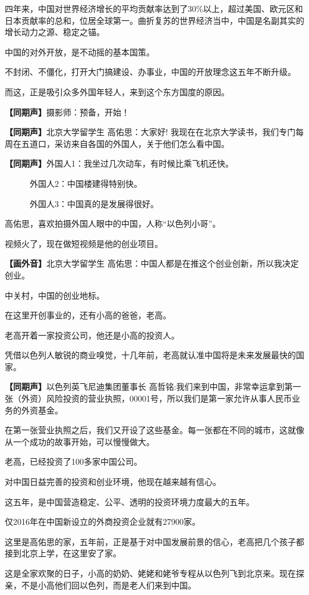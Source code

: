 \documentclass{ctexart}
\newcommand{\zkh}[1]{\textbf{\hspace{-2.7em} 【#1】}}
\begin{document}
四年来，中国对世界经济增长的平均贡献率达到了30{\%}以上，超过美国、欧元区和日本贡献率的总和，位居全球第一。曲折复苏的世界经济当中，中国是名副其实的增长动力之源、稳定之锚。

中国的对外开放，是不动摇的基本国策。

不封闭、不僵化，打开大门搞建设、办事业，中国的开放理念这五年不断升级。

而这，正是吸引众多外国年轻人，来到这个东方国度的原因。

\zkh{同期声}摄影师：预备，开始！

\zkh{同期声}北京大学留学生 高佑思：大家好! 
我现在在北京大学读书，我们专门每周在五道口，采访来自各国的外国人，关于他们怎么看中国。

\zkh{同期声}外国人1：我坐过几次动车，有时候比乘飞机还快。

　　　外国人2：中国楼建得特别快。

　　　外国人3：中国真的是发展得很好。

高佑思，喜欢拍摄外国人眼中的中国，人称``以色列小哥''。

视频火了，现在做短视频是他的创业项目。

\zkh{画外音}北京大学留学生 高佑思：中国人都是在推这个创业创新，所以我决定创业。

中关村，中国的创业地标。

在这里开创事业的，还有小高的爸爸，老高。

老高开着一家投资公司，他还是小高的投资人。

凭借以色列人敏锐的商业嗅觉，十几年前，老高就认准中国将是未来发展最快的国家。

\zkh{同期声}以色列英飞尼迪集团董事长 高哲铭:我们来到中国，非常幸运拿到第一张（外资）风险投资的营业执照，00001号，所以我们是第一家允许从事人民币业务的外资基金。

在第一张营业执照之后，我们又开设了这些基金。每一张都在不同的城市，这就像从一个成功的故事开始，可以慢慢做大。

老高，已经投资了100多家中国公司。

对中国日益完善的投资和创业环境，他现在越来越有信心。

这五年，是中国营造稳定、公平、透明的投资环境力度最大的五年。

仅2016年在中国新设立的外商投资企业就有27900家。

这里是高佑思的家，五年前，正是基于对中国发展前景的信心，老高把几个孩子都接到北京上学，在这里安了家。

这是全家欢聚的日子，小高的奶奶、姥姥和姥爷专程从以色列飞到北京来。现在探亲，不是小高他们回以色列，而是老人们来到中国。
\end{document}
